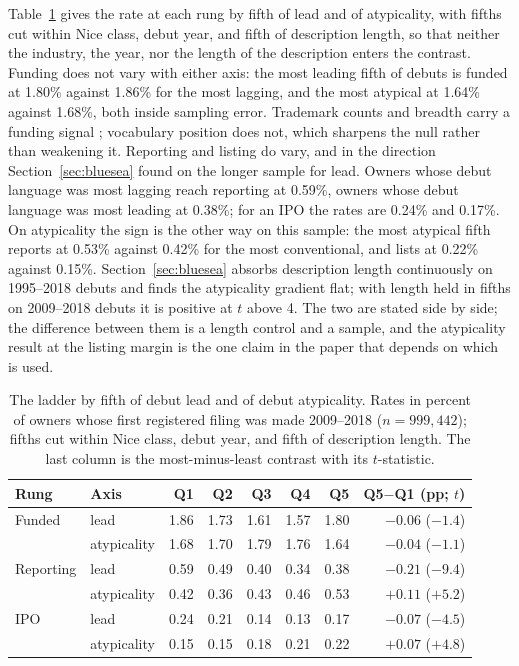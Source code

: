 Table~\ref{tab:ladder} gives the rate at each rung by fifth of lead and of
atypicality, with fifths cut within Nice class, debut year, and fifth of
description length, so that neither the industry, the year, nor the length
of the description enters the contrast. Funding does not vary with either
axis: the most leading fifth of debuts is funded at 1.80\% against 1.86\%
for the most lagging, and the most atypical at 1.64\% against 1.68\%, both
inside sampling error. Trademark counts and breadth carry a funding signal
\citep{Block2014}; vocabulary position does not, which sharpens the null
rather than weakening it. Reporting and listing do vary, and in the direction
Section~\ref{sec:bluesea} found on the longer sample for lead. Owners whose
debut language was most lagging reach reporting at 0.59\%, owners whose
debut language was most leading at 0.38\%; for an IPO the rates are 0.24\%
and 0.17\%. On atypicality the sign is the other way on this sample: the
most atypical fifth reports at 0.53\% against 0.42\% for the most
conventional, and lists at 0.22\% against 0.15\%. Section~\ref{sec:bluesea}
absorbs description length continuously on 1995--2018 debuts and finds the
atypicality gradient flat; with length held in fifths on 2009--2018 debuts
it is positive at $t$ above 4. The two are stated side by side; the
difference between them is a length control and a sample, and the
atypicality result at the listing margin is the one claim in the paper that
depends on which is used.

\begin{table}[h]\centering\small
\caption{The ladder by fifth of debut lead and of debut atypicality. Rates
in percent of owners whose first registered filing was made 2009--2018
($n = 999{,}442$); fifths cut within Nice class, debut year, and fifth of
description length. The last column is the most-minus-least contrast with
its $t$-statistic.}
\label{tab:ladder}
\begin{tabular}{llrrrrrr}
\toprule
Rung & Axis & Q1 & Q2 & Q3 & Q4 & Q5 & Q5$-$Q1 (pp; $t$) \\
\midrule
Funded    & lead         & 1.86 & 1.73 & 1.61 & 1.57 & 1.80 & $-0.06$ ($-1.4$) \\
          & atypicality  & 1.68 & 1.70 & 1.79 & 1.76 & 1.64 & $-0.04$ ($-1.1$) \\
Reporting & lead         & 0.59 & 0.49 & 0.40 & 0.34 & 0.38 & $-0.21$ ($-9.4$) \\
          & atypicality  & 0.42 & 0.36 & 0.43 & 0.46 & 0.53 & $+0.11$ ($+5.2$) \\
IPO       & lead         & 0.24 & 0.21 & 0.14 & 0.13 & 0.17 & $-0.07$ ($-4.5$) \\
          & atypicality  & 0.15 & 0.15 & 0.18 & 0.21 & 0.22 & $+0.07$ ($+4.8$) \\
\bottomrule
\end{tabular}
\end{table}

